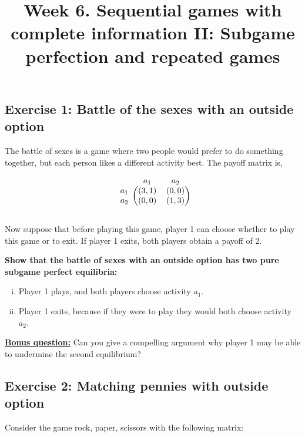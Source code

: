 \documentclass[10pt]{article}
\title{\textbf{Week 6.} Sequential games with complete information II: Subgame perfection and repeated games}
\date{}
\begin{document}
\maketitle
\vspace{-1cm}

\subsection*{Exercise 1: Battle of the sexes with an outside option}

The battle of sexes is a game where two people would prefer to do something
together, but each person likes a different activity best. The payoff matrix is,

\begin{equation*}
    \begin{blockarray}{ccc}
        & a_1 & a_2 \\
        \begin{block}{c(cc)}
            a_1 & (3, 1) & (0, 0) \\
            a_2 & (0, 0) & (1, 3) \\
        \end{block}
    \end{blockarray}
\end{equation*}

Now suppose that before playing this game, player 1 can choose whether to play
this game or to exit. If player 1 exits, both players obtain a payoff of 2.

\textbf{Show that the battle of sexes with an outside option has two pure
subgame perfect equilibria:}

\begin{enumerate}[(i)]
    \item Player 1 plays, and both players choose activity \(a_1\).
    \item Player 1 exits, because if they were to play they would both choose
    activity \(a_2\).
\end{enumerate}

\underline{\textbf{Bonus question:}} Can you give a compelling argument why
player 1 may be able to undermine the second equilibrium?

\subsection*{Exercise 2: Matching pennies with outside option}

Consider the game rock, paper, scissors with the following matrix:
\end{document}
